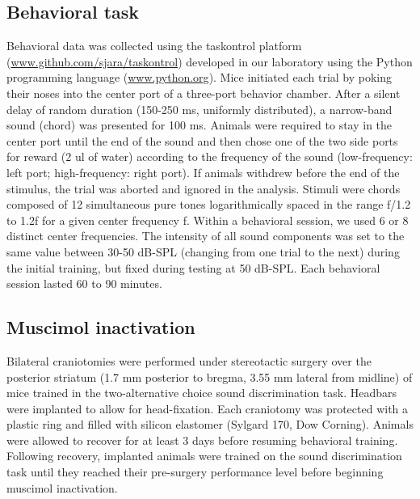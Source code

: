 \subsection{Behavioral task}
Behavioral data was collected using the taskontrol platform (\url{www.github.com/sjara/taskontrol}) developed in our laboratory using the Python programming language (\url{www.python.org}). Mice initiated each trial by poking their noses into the center port of a three-port behavior chamber. After a silent delay of random duration (150-250 ms, uniformly distributed), a narrow-band sound (chord) was presented for 100 ms. Animals were required to stay in the center port until the end of the sound and then chose one of the two side ports for reward (2 ul of water) according to the frequency of the sound (low-frequency: left port; high-frequency: right port). If animals withdrew before the end of the stimulus, the trial was aborted and ignored in the analysis. Stimuli were chords composed of 12 simultaneous pure tones logarithmically spaced in the range f/1.2 to 1.2f for a given center frequency f. Within a behavioral session, we used 6 or 8 distinct center frequencies. The intensity of all sound components was set to the same value between 30-50 dB-SPL (changing from one trial to the next) during the initial training, but fixed during testing at 50 dB-SPL. Each behavioral session lasted 60 to 90 minutes.

\subsection{Muscimol inactivation}
Bilateral craniotomies were performed under stereotactic surgery over the posterior striatum (1.7 mm posterior to bregma, 3.55 mm lateral from midline) of mice trained in the two-alternative choice sound discrimination task. Headbars were implanted to allow for head-fixation. Each craniotomy was protected with a plastic ring and filled with silicon elastomer (Sylgard 170, Dow Corning). Animals were allowed to recover for at least 3 days before resuming behavioral training. Following recovery, implanted animals were trained on the sound discrimination task until they reached their pre-surgery performance level before beginning muscimol inactivation.

